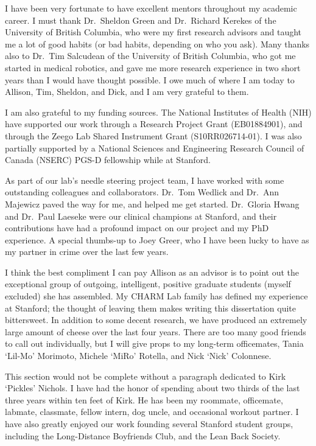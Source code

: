 \documentclass[12pt,twoside]{report}
\begin{document}
I have been very fortunate to have excellent mentors throughout my academic career. I must thank Dr.\ Sheldon Green and Dr.\ Richard Kerekes of the University of British Columbia, who were my first research advisors and taught me a lot of good habits (or bad habits, depending on who you ask). Many thanks also to Dr.\ Tim Salcudean of the University of British Columbia, who got me started in medical robotics, and gave me more research experience in two short years than I would have thought possible. I owe much of where I am today to Allison, Tim, Sheldon, and Dick, and I am very grateful to them.    

I am also grateful to my funding sources. The National Institutes of Health (NIH) have supported our work through a Research Project Grant (EB01884901), and through the Zeego Lab Shared Instrument Grant (S10RR026714-01). I was also partially supported by a National Sciences and Engineering Research Council of Canada (NSERC) PGS-D fellowship while at Stanford.   

As part of our lab's needle steering project team, I have worked with some outstanding colleagues and collaborators. Dr.\ Tom Wedlick and Dr.\ Ann Majewicz paved the way for me, and helped me get started. Dr.\ Gloria Hwang and Dr.\ Paul Laeseke were our clinical champions at Stanford, and their  contributions have had a profound impact on our project and my PhD experience. A special thumbs-up to Joey Greer, who I have been lucky to have as my partner in crime over the last few years.

I think the best compliment I can pay Allison as an advisor is to point out the exceptional group of outgoing, intelligent, positive graduate students (myself excluded) she has assembled. My CHARM Lab family has defined my experience at Stanford; the thought of leaving them makes writing this dissertation quite bittersweet. In addition to some decent research, we have produced an extremely large amount of cheese over the last four years. There are too many good friends to call out individually, but I will give props to my long-term officemates, Tania `Lil-Mo' Morimoto, Michele `MiRo' Rotella, and Nick `Nick' Colonnese. 

This section would not be complete without a paragraph dedicated to Kirk `Pickles' Nichols. I have had the honor of spending about two thirds of the last three years within ten feet of Kirk. He has been my roommate, officemate, labmate, classmate, fellow intern, dog uncle, and occasional workout partner. I have also greatly enjoyed our work founding several Stanford student groups, including the Long-Distance Boyfriends Club, and the Lean Back Society.     
\end{document}
